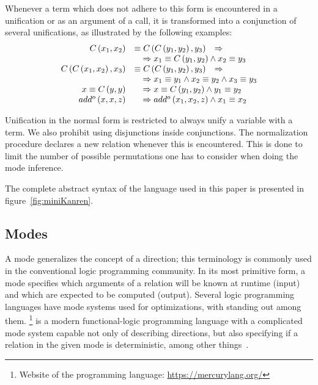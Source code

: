 Whenever a term which does not adhere to this form is encountered in a unification or as an argument of a call, it is transformed into a conjunction of several unifications, as illustrated by the following examples:
\[
    \begin{array}{rll}
        C\left( x_1, x_2 \right)                      & \equiv C\left( C\left( y_1, y_2 \right), y_3 \right)                                          & \Rightarrow \\
                                                      & \multicolumn{2}{l}{\quad\Rightarrow x_1 \equiv C\left( y_1, y_2 \right) \land x_2 \equiv y_3}               \\
        C\left( C\left( x_1, x_2 \right), x_3 \right) & \equiv C\left( C\left( y_1, y_2 \right), y_3 \right)                                          & \Rightarrow \\
                                                      & \multicolumn{2}{l}{\quad\Rightarrow x_1 \equiv y_1 \land x_2 \equiv y_2 \land x_3 \equiv y_3}               \\
        x \equiv C \left(y, y \right)                 & \multicolumn{2}{l}{\quad\Rightarrow x \equiv C \left(y_1, y_2\right) \land y_1 \equiv y_2}                  \\
        add^o\left( x, x, z \right)                   & \multicolumn{2}{l}{\quad\Rightarrow add^o\left( x_1, x_2, z \right) \land x_1 \equiv x_2}
    \end{array}
\]

Unification in the normal form is restricted to always unify a variable with a term.
We also prohibit using disjunctions inside conjunctions.
The normalization procedure declares a new relation whenever this is encountered.
This is done to limit the number of possible permutations one has to consider when doing the mode inference.

The complete abstract syntax of the \mk language used in this paper is presented in figure~\ref{fig:miniKanren}.

\label{sec:mode}
\subsection{Modes}




A mode generalizes the concept of a direction; this terminology is commonly used in the conventional logic programming community.
In its most primitive form, a mode specifies which arguments of a relation will be known at runtime (input) and which are expected to be computed (output).
Several logic programming languages have mode systems used for optimizations, with \merc standing out among them.
\merc\footnote{Website of the \merc programming language: \url{https://mercurylang.org/}} is a modern functional-logic programming language with a complicated mode system capable not only of describing directions, but also specifying if a relation in the given mode is deterministic, among other things~\cite{overton2002constraint}.

